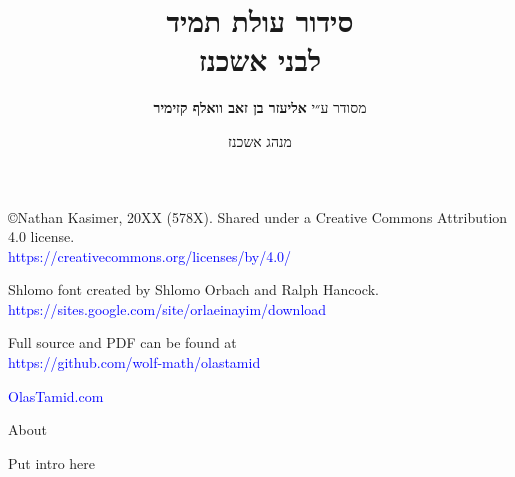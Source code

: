 \documentclass[twoside, openany, parskip=half, 11pt]{book}
\begin{document}
\title{  סידור עולת תמיד \\
לבני אשכנז\\
\vspace{.5in}
}

\author{מסודר ע״י
\textbf{אליעזר בן זאב וואלף קזימיר}}
\date{מנהג אשכנז}

\maketitle

\begin{minipage}{\textwidth}
\begin{english}
\raggedright

©Nathan Kasimer, 20XX (578X). Shared under a Creative Commons Attribution 4.0 license.\\
\textcolor{blue}{https://creativecommons.org/licenses/by/4.0/}\\ \vspace{\baselineskip}


Shlomo font created by Shlomo Orbach and Ralph Hancock.\\ \textcolor{blue}{https://sites.google.com/site/orlaeinayim/download}\\ \vspace{\baselineskip}

Full \XeLaTeX \quad source and PDF can be found at\\ \textcolor{blue}{https://github.com/wolf-math/olastamid}\\ \vspace{\baselineskip}

\textcolor{blue}{OlasTamid.com}

\end{english}
\end{minipage}


\clearpage

\begin{minipage}{\textwidth}

\begin{english}
\begin{center} %
\begin{LARGE}
About
\end{LARGE}
\end{center}

Put intro here


\end{english}

\end{minipage}
\end{document}
